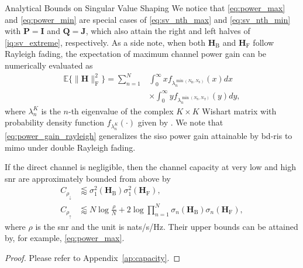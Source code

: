 \begin{section}{Analytical Bounds on Singular Value Shaping}
	We notice that \eqref{eq:power_max} and \eqref{eq:power_min} are special cases of \eqref{eq:sv_nth_max} and \eqref{eq:sv_nth_min} with $\mathbf{P} = \mathbf{I}$ and $\mathbf{Q} = \mathbf{J}$, which also attain the right and left halves of \eqref{iq:sv_extreme}, respectively.
	As a side note, when both $\mathbf{H}_\mathrm{B}$ and $\mathbf{H}_\mathrm{F}$ follow Rayleigh fading, the expectation of maximum channel power gain can be numerically evaluated as
	\begin{equation}
		\begin{split}
			\mathbb{E}\bigl\{ \lVert \mathbf{H} \rVert _ \mathrm{F}^2 \bigr\} = \sum_{n=1}^N
			& \int_0^\infty x f_{\lambda_n^{\min(N_\mathrm{R},N_\mathrm{S})}}(x) d x         \\
			& \times \int_0^\infty y f_{\lambda_n^{\min(N_\mathrm{S},N_\mathrm{T})}}(y) d y,
		\end{split}
		\label{eq:power_gain_rayleigh}
	\end{equation}
	where $\lambda_n^{K}$ is the $n$-th eigenvalue of the complex $K \times K$ Wishart matrix with probability density function $f_{\lambda_n^{K}}(\cdot)$ given by \cite[(51)]{Zanella2009}.
	We note that \eqref{eq:power_gain_rayleigh} generalizes the \gls{siso} power gain attainable by \gls{bd}-\gls{ris} \cite[(58)]{Shen2020a} to \gls{mimo} under double Rayleigh fading.

	\begin{corollary}
		If the direct channel is negligible, then the channel capacity at very low and high \gls{snr} are approximately bounded from above by
		\begin{subequations}
			\begin{align}
				C_{\rho_\downarrow} & \lessapprox \sigma_1^2(\mathbf{H}_\mathrm{B}) \sigma_1^2(\mathbf{H}_\mathrm{F}), \label{iq:capacity_snr_low}                                           \\
				C_{\rho_\uparrow}   & \lessapprox N \log \frac{\rho}{N} + 2 \log \prod_{n=1}^N \sigma_n(\mathbf{H}_\mathrm{B}) \sigma_n(\mathbf{H}_\mathrm{F}), \label{iq:capacity_snr_high}
			\end{align}
		\end{subequations}
		where $\rho$ is the \gls{snr} and the unit is nats/s/Hz.
		Their upper bounds can be attained by, for example, \eqref{eq:power_max}.
	\end{corollary}

	\begin{proof}
		Please refer to Appendix~\ref{ap:capacity}.
	\end{proof}


\end{section}
